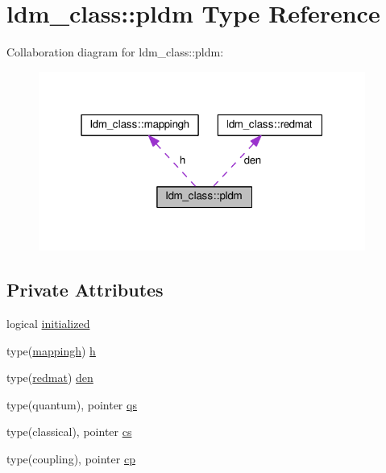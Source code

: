 \hypertarget{structldm__class_1_1pldm}{\section{ldm\+\_\+class\+:\+:pldm Type Reference}
\label{structldm__class_1_1pldm}
}


Collaboration diagram for ldm\+\_\+class\+:\+:pldm\+:\nopagebreak
\begin{figure}[H]
\begin{center}
\leavevmode
\includegraphics[width=304pt]{structldm__class_1_1pldm__coll__graph}
\end{center}
\end{figure}
\subsection*{Private Attributes}
\begin{DoxyCompactItemize}
\item 
logical \hyperlink{structldm__class_1_1pldm_a9e7c99c2898b7cd687638fb1d6f5800c}{initialized}
\item 
type(\hyperlink{structldm__class_1_1mappingh}{mappingh}) \hyperlink{structldm__class_1_1pldm_af5cfb52905ca6c3b4069bfbe3eb2afdb}{h}
\item 
type(\hyperlink{structldm__class_1_1redmat}{redmat}) \hyperlink{structldm__class_1_1pldm_ac785228707f5246b180a08c9b94bf437}{den}
\item 
type(quantum), pointer \hyperlink{structldm__class_1_1pldm_acf354ba01790a6d541eeb86739e0a5c4}{qs}
\item 
type(classical), pointer \hyperlink{structldm__class_1_1pldm_a83adb89b8aff81ac0a5c072c3fd79280}{cs}
\item 
type(coupling), pointer \hyperlink{structldm__class_1_1pldm_a5bb9f63f699c8b080da3d40a437258a3}{cp}
\end{DoxyCompactItemize}


